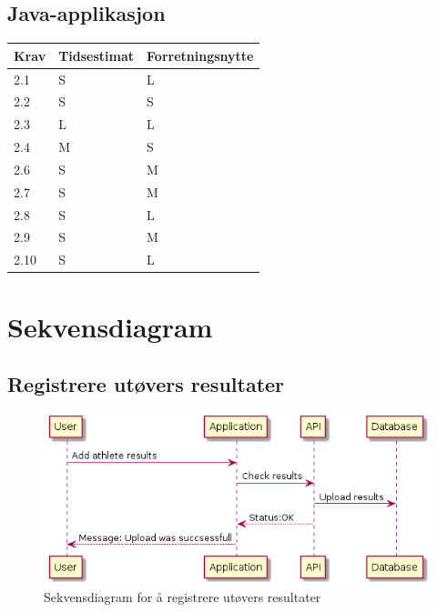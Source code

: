 \documentclass[norsk]{article}
\begin{document}
\subsection{Java-applikasjon}
\begin{table}[h]
\begin{tabular}{|l|l|l|}
\hline
Krav & Tidsestimat & Forretningsnytte \\ \hline
2.1  & S           & L               \\ \hline
2.2  & S           & S               \\ \hline
2.3  & L           & L               \\ \hline
2.4  & M           & S               \\ \hline
2.6  & S           & M               \\ \hline
2.7  & S           & M               \\ \hline
2.8  & S           & L               \\ \hline
2.9  & S           & M               \\ \hline
2.10 & S           & L               \\ \hline
\end{tabular}
\end{table}

\section{Sekvensdiagram}
\subsection{Registrere utøvers resultater}

\begin{figure}[ht]
\centering 
    \includegraphics[scale=0.6]{images/add-athlete-results}
    \caption{Sekvensdiagram for å registrere utøvers resultater}\label{fig:add-at-res}
\end{figure}
\end{document}
